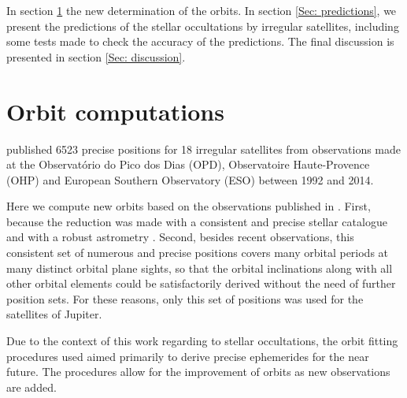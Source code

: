\documentclass[useAMS,usenatbib]{mn2e}
\begin{document}

In section \ref{Sec: integration} the new determination of the orbits. In section \ref{Sec: predictions}, we present the predictions of the stellar occultations by irregular satellites, including some tests made to check the accuracy of the predictions. The final discussion is presented in section \ref{Sec: discussion}.

\section{Orbit computations} \label{Sec: integration}

\cite{GomesJunior2015} published 6523 precise positions for 18 irregular satellites from observations made at the Observatório do Pico dos Dias (OPD), Observatoire Haute-Provence (OHP) and European Southern Observatory (ESO) between 1992 and 2014. 

Here we compute new orbits based on the observations published in \cite{GomesJunior2015}. First, because the reduction was made with a consistent and precise stellar catalogue and with a robust astrometry \citep[PRAIA,][]{Assafin2011}. Second, besides recent observations, this consistent set of numerous and precise positions covers many orbital periods at many distinct orbital plane sights, so that the orbital inclinations along with all other orbital elements could be satisfactorily derived without the need of further position sets. For these reasons, only this set of positions was used for the satellites of Jupiter.

Due to the context of this work regarding to stellar occultations, the orbit fitting procedures used aimed primarily to derive precise ephemerides for the near future. The procedures allow for the improvement of orbits as new observations are added.
\end{document}
